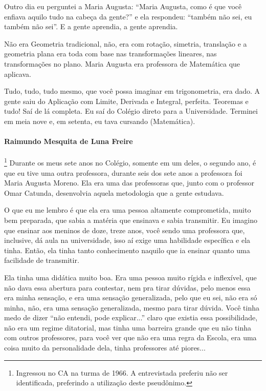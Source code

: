 \documentclass{hipatia}
\begin{document}
Outro dia eu perguntei a Maria Augusta: ``Maria Augusta, como é que você
enfiava aquilo tudo na cabeça da gente?'' e ela respondeu: ``também não
sei, eu também não sei''. E a gente aprendia, a gente aprendia.

Não era Geometria tradicional, não, era com rotação, simetria,
translação e a geometria plana era toda com base nas transformações
lineares, nas transformações no plano. Maria Augusta era professora de
Matemática que aplicava.

Tudo, tudo, tudo mesmo, que você possa imaginar em trigonometria, era
dado. A gente saiu do Aplicação com Limite, Derivada e Integral,
perfeita. Teoremas e tudo! Saí de lá completa. Eu saí do Colégio direto
para a Universidade. Terminei em meia nove e, em setenta, eu tava
cursando (Matemática).

\paragraph{Raimundo Mesquita de Luna Freire}\footnote{Ingressou no CA na
  turma de 1966. A entrevistada preferiu não ser identificada,
  preferindo a utilização deste pseudônimo.}
Durante os meus sete anos no Colégio, somente em um deles, o segundo
ano, é que eu tive uma outra professora, durante seis dos sete anos a
professora foi Maria Augusta Moreno. Ela era uma das professoras que,
junto com o professor Omar Catunda, desenvolvia aquela metodologia que a
gente estudava.

O que eu me lembro é que ela era uma pessoa altamente comprometida,
muito bem preparada, que sabia a matéria que ensinava e sabia
transmitir. Eu imagino que ensinar aos meninos de doze, treze anos, você
sendo uma professora que, inclusive, dá aula na universidade, isso aí
exige uma habilidade específica e ela tinha. Então, ela tinha tanto
conhecimento naquilo que ia ensinar quanto uma facilidade de transmitir.

Ela tinha uma didática muito boa. Era uma pessoa muito rígida e
inflexível, que não dava essa abertura para contestar, nem pra tirar
dúvidas, pelo menos essa era minha sensação, e era uma sensação
generalizada, pelo que eu sei, não era só minha, não, era uma sensação
generalizada, mesmo para tirar dúvida. Você tinha medo de dizer ``não
entendi, pode explicar...'' claro que existia essa possibilidade, não
era um regime ditatorial, mas tinha uma barreira grande que eu não tinha
com outros professores, para você ver que não era uma regra da Escola,
era uma coisa muito da personalidade dela, tinha professores até
piores...
\end{document}
